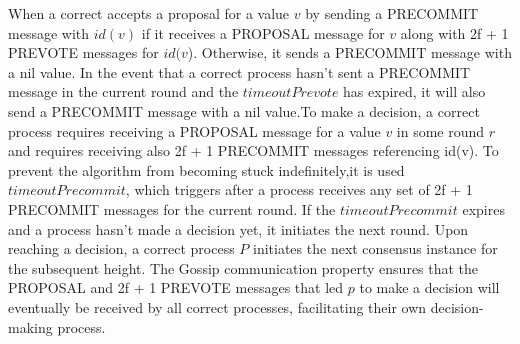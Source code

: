 \documentclass{article}
\begin{document}
	When a correct accepts a proposal for a value $v$ by sending a PRECOMMIT message with $id(v)$ if it receives a PROPOSAL message for $v$ along with 2f + 1 PREVOTE messages for $id(v$). Otherwise, it sends a PRECOMMIT message with a nil value. In the event that a correct process hasn't sent a PRECOMMIT message in the current round and the $timeoutPrevote$ has expired, it will also send a PRECOMMIT message with a nil value.To make a decision, a correct process requires receiving a PROPOSAL message for a value $v$ in some round $r$ and requires receiving also 2f + 1 PRECOMMIT messages referencing id(v). To prevent the algorithm from becoming stuck indefinitely,it is used $timeoutPrecommit$, which triggers after a process receives any set of 2f + 1 PRECOMMIT messages for the current round. If the $timeoutPrecommit$ expires and a process hasn't made a decision yet, it initiates the next round. Upon reaching a decision, a correct process $P$ initiates the next consensus instance for the subsequent height. The Gossip communication property ensures that the PROPOSAL and 2f + 1 PREVOTE messages that led $p$ to make a decision will eventually be received by all correct processes, facilitating their own decision-making process.
\end{document}
